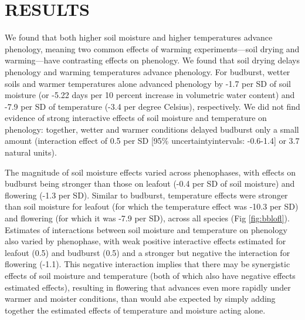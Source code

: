 \documentclass{article}
\begin{document}
\section* {RESULTS}
\par We found that both higher soil moisture and higher temperatures advance phenology, meaning two common effects of warming experiments---soil drying and warming---have contrasting effects on phenology. We found that soil drying delays phenology and warming temperatures advance phenology. For budburst, wetter soils and warmer temperatures alone advanced phenology by -1.7 per SD of soil moisture  (or -5.22 days per 10 percent increase in volumetric water content) and -7.9 per SD of temperature (-3.4 per degree Celsius), respectively. We did not find evidence of strong interactive effects of soil moisture and temperature on phenology: together, wetter and warmer conditions delayed budburst only a small amount (interaction effect of 0.5 per SD [95\% uncertaintyintervals: -0.6-1.4] or 3.7 natural units). 
\par The magnitude of soil moisture effects varied across phenophases, with effects on budburst being stronger than those on leafout (-0.4 per SD of soil moisture) and flowering (-1.3 per SD). Similar to budburst, temperature effects were stronger than soil moisture for leafout (for which the temperature effect was -10.3 per SD) and flowering (for which it was -7.9 per SD), across all species (Fig \ref{fig:bblofl}). Estimates of interactions between soil moisture and temperature on phenology also varied by phenophase, with weak positive interactive effects estimated for leafout (0.5) and budburst (0.5) and a stronger but negative the interaction for flowering (-1.1). This negative interaction implies that there may be synergistic effects of soil moisture and temperature (both of which also have negative effects estimated effects), resulting in flowering that advances even more rapidly under warmer and moister conditions, than would abe expected by simply adding together the  estimated effects of temperature and  moisture acting alone. 
\end{document}
